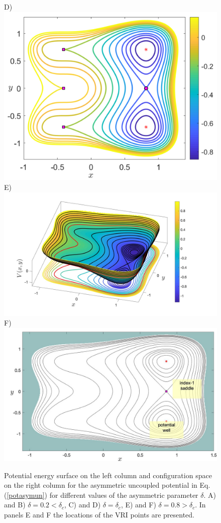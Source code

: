 \documentclass[10pt,aps,onecolumn,superscriptaddress]{revtex4-2}
\begin{document}
\begin{figure}[htbp]
\begin{center}
		D)\includegraphics[scale=0.3]{pes_conts_asymm_bif_nocoup.pdf}
		E)\includegraphics[scale=0.16]{pes_asymm_del_08_nocoup_v2.jpg}
		F)\includegraphics[scale=0.6]{VRI_delta_08.jpg}
	\end{center}
	\caption{Potential energy surface on the left column and configuration space on the right column for the asymmetric uncoupled potential in Eq. (\ref{potasymun}) for different values of the asymmetric parameter $\delta$. A) and B) $\delta = 0.2 < \delta_c$, C) and D) $\delta = \delta_c$, E) and F) $\delta = 0.8 > \delta_c$. In panels E and F the locations of the VRI points are presented.}\label{asym_pot_dif_delta}
\end{figure}
\end{document}
